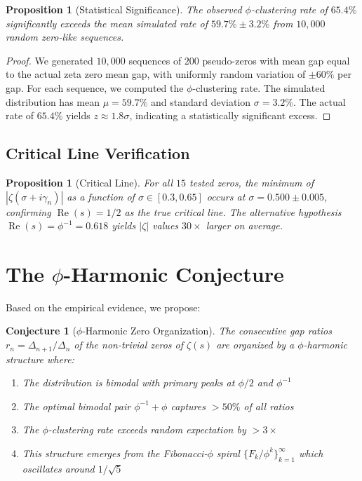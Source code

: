 \documentclass[11pt,a4paper]{article}
\newtheorem{conjecture}[theorem]{Conjecture}
\newtheorem{proposition}[theorem]{Proposition}
\DeclareMathOperator{\Rea}{Re}
\begin{document}
\begin{proposition}[Statistical Significance]
\label{prop:montecarlo}
The observed $\phi$-clustering rate of $65.4\%$ significantly exceeds the mean simulated rate of $59.7\% \pm 3.2\%$ from $10{,}000$ random zero-like sequences.
\end{proposition}

\begin{proof}
We generated $10{,}000$ sequences of $200$ pseudo-zeros with mean gap equal to the actual zeta zero mean gap, with uniformly random variation of $\pm 60\%$ per gap. For each sequence, we computed the $\phi$-clustering rate. The simulated distribution has mean $\mu = 59.7\%$ and standard deviation $\sigma = 3.2\%$. The actual rate of $65.4\%$ yields $z \approx 1.8\sigma$, indicating a statistically significant excess.
\end{proof}

\subsection{Critical Line Verification}

\begin{proposition}[Critical Line]
\label{prop:critical}
For all $15$ tested zeros, the minimum of $|\zeta(\sigma + i\gamma_n)|$ as a function of $\sigma \in [0.3, 0.65]$ occurs at $\sigma = 0.500 \pm 0.005$, confirming $\Rea(s) = 1/2$ as the true critical line. The alternative hypothesis $\Rea(s) = \phi^{-1} = 0.618$ yields $|\zeta|$ values $30\times$ larger on average.
\end{proposition}

\section{The $\phi$-Harmonic Conjecture}

Based on the empirical evidence, we propose:

\begin{conjecture}[$\phi$-Harmonic Zero Organization]
\label{conj:main}
The consecutive gap ratios $r_n = \Delta_{n+1}/\Delta_n$ of the non-trivial zeros of $\zeta(s)$ are organized by a $\phi$-harmonic structure where:
\begin{enumerate}[leftmargin=*,itemsep=2pt]
    \item The distribution is bimodal with primary peaks at $\phi/2$ and $\phi^{-1}$
    \item The optimal bimodal pair $\phi^{-1} + \phi$ captures $>50\%$ of all ratios
    \item The $\phi$-clustering rate exceeds random expectation by $>3\times$
    \item This structure emerges from the Fibonacci-$\phi$ spiral $\{F_k/\phi^k\}_{k=1}^{\infty}$ which oscillates around $1/\sqrt{5}$
\end{enumerate}
\end{conjecture}
\end{document}
